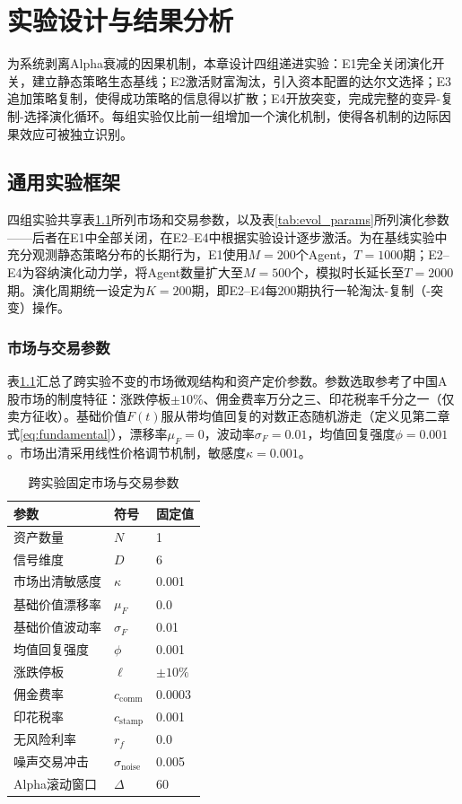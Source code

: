 ﻿\chapter{实验设计与结果分析}
\label{chap:experiments}

为系统剥离Alpha衰减的因果机制，本章设计四组递进实验：E1完全关闭演化开关，建立静态策略生态基线；E2激活财富淘汰，引入资本配置的达尔文选择；E3追加策略复制，使得成功策略的信息得以扩散；E4开放突变，完成完整的变异-复制-选择演化循环。每组实验仅比前一组增加一个演化机制，使得各机制的边际因果效应可被独立识别。

\section{通用实验框架}

四组实验共享表\ref{tab:fixed_params}所列市场和交易参数，以及表\ref{tab:evol_params}所列演化参数——后者在E1中全部关闭，在E2--E4中根据实验设计逐步激活。为在基线实验中充分观测静态策略分布的长期行为，E1使用$M=200$个Agent，$T=1000$期；E2--E4为容纳演化动力学，将Agent数量扩大至$M=500$个，模拟时长延长至$T=2000$期。演化周期统一设定为$K=200$期，即E2--E4每200期执行一轮淘汰-复制（-突变）操作。

\subsection{市场与交易参数}

表\ref{tab:fixed_params}汇总了跨实验不变的市场微观结构和资产定价参数。参数选取参考了中国A股市场的制度特征：涨跌停板$\pm 10\%$、佣金费率万分之三、印花税率千分之一（仅卖方征收）。基础价值$F(t)$服从带均值回复的对数正态随机游走（定义见第二章式\eqref{eq:fundamental}），漂移率$\mu_F=0$，波动率$\sigma_F=0.01$，均值回复强度$\phi=0.001$。市场出清采用线性价格调节机制，敏感度$\kappa=0.001$。

\begin{table}[htb]
\centering
\caption{跨实验固定市场与交易参数}
\label{tab:fixed_params}
\begin{tabular}{@{}lll@{}}
\toprule
参数 & 符号 & 固定值 \\
\midrule
资产数量 & $N$ & 1 \\
信号维度 & $D$ & 6 \\
市场出清敏感度 & $\kappa$ & 0.001 \\
基础价值漂移率 & $\mu_F$ & 0.0 \\
基础价值波动率 & $\sigma_F$ & 0.01 \\
均值回复强度 & $\phi$ & 0.001 \\
涨跌停板 & $\ell$ & $\pm 10\%$ \\
佣金费率 & $c_{\text{comm}}$ & 0.0003 \\
印花税率 & $c_{\text{stamp}}$ & 0.001 \\
无风险利率 & $r_f$ & 0.0 \\
噪声交易冲击 & $\sigma_{\text{noise}}$ & 0.005 \\
Alpha滚动窗口 & $\Delta$ & 60 \\
\bottomrule
\end{tabular}
\end{table}

